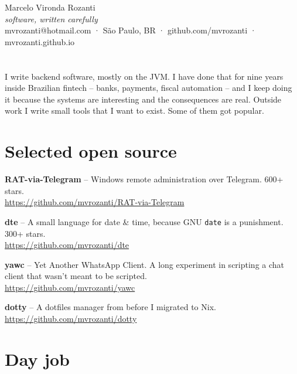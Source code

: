 \documentclass[10pt,a4paper]{article}
\begin{document}
\begin{center}
{\huge Marcelo Vironda Rozanti}\\[3pt]
{\itshape\color{muted} software, written carefully}\\[3pt]
{\small mvrozanti@hotmail.com · São Paulo, BR · github.com/mvrozanti · mvrozanti.github.io}
\end{center}

\section*{}

I write backend software, mostly on the JVM. I have done that for nine years inside Brazilian fintech -- banks, payments, fiscal automation -- and I keep doing it because the systems are interesting and the consequences are real. Outside work I write small tools that I want to exist. Some of them got popular.

\section{Selected open source}

\noindent\textbf{RAT-via-Telegram} -- Windows remote administration over Telegram. 600+ stars.\\
{\small\color{muted}\url{https://github.com/mvrozanti/RAT-via-Telegram}}
\par\medskip

\noindent\textbf{dte} -- A small language for date \& time, because GNU \texttt{date} is a punishment. 300+ stars.\\
{\small\color{muted}\url{https://github.com/mvrozanti/dte}}
\par\medskip

\noindent\textbf{yawc} -- Yet Another WhatsApp Client. A long experiment in scripting a chat client that wasn't meant to be scripted.\\
{\small\color{muted}\url{https://github.com/mvrozanti/yawc}}
\par\medskip

\noindent\textbf{dotty} -- A dotfiles manager from before I migrated to Nix.\\
{\small\color{muted}\url{https://github.com/mvrozanti/dotty}}

\section{Day job}
\end{document}
